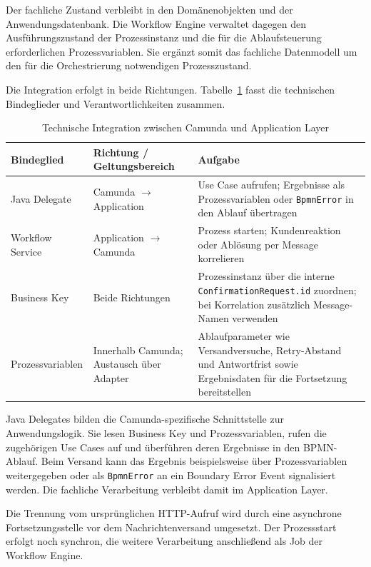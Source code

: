 \documentclass[
  12pt,
  a4paper,
  oneside
]{article}
\begin{document}
Der fachliche Zustand verbleibt in den Domänenobjekten und der
Anwendungsdatenbank. Die Workflow Engine verwaltet dagegen den
Ausführungszustand der Prozessinstanz und die für die Ablaufsteuerung
erforderlichen Prozessvariablen. Sie ergänzt somit das fachliche Datenmodell um
den für die Orchestrierung notwendigen Prozesszustand.

Die Integration erfolgt in beide Richtungen.
Tabelle~\ref{tab:workflow-integration} fasst die technischen Bindeglieder und
Verantwortlichkeiten zusammen.

\begin{table}[htbp]
  \centering
  \caption{Technische Integration zwischen Camunda und Application Layer}
  \label{tab:workflow-integration}
  \small
  \setlength{\tabcolsep}{5pt}
  \begin{tabularx}{\textwidth}{@{}>{\raggedright\arraybackslash}p{}>{\raggedright\arraybackslash}p{}>{\raggedright\arraybackslash}X@{}}
    \toprule
    Bindeglied & Richtung / Geltungsbereich & Aufgabe \\
    \midrule
    Java Delegate & Camunda $\rightarrow$ Application
      & Use Case aufrufen; Ergebnisse als Prozessvariablen oder \texttt{BpmnError} in den Ablauf übertragen \\
    Workflow Service & Application $\rightarrow$ Camunda
      & Prozess starten; Kundenreaktion oder Ablösung per Message korrelieren \\
    Business Key & Beide Richtungen
      & Prozessinstanz über die interne \texttt{ConfirmationRequest.id} zuordnen; bei Korrelation zusätzlich Message-Namen verwenden \\
    Prozessvariablen & Innerhalb Camunda; Austausch über Adapter
      & Ablaufparameter wie Versandversuche, Retry-Abstand und Antwortfrist sowie Ergebnisdaten für die Fortsetzung bereitstellen \\
    \bottomrule
  \end{tabularx}
\end{table}

Java Delegates bilden die Camunda-spezifische Schnittstelle zur
Anwendungslogik. Sie lesen Business Key und Prozessvariablen, rufen die
zugehörigen Use Cases auf und überführen deren Ergebnisse in den
BPMN-Ablauf. Beim Versand kann das Ergebnis beispielsweise über
Prozessvariablen weitergegeben oder als \texttt{BpmnError} an ein Boundary
Error Event signalisiert werden. Die fachliche Verarbeitung verbleibt damit im
Application Layer.

Die Trennung vom ursprünglichen HTTP-Aufruf wird durch eine asynchrone
Fortsetzungsstelle vor dem Nachrichtenversand umgesetzt. Der Prozessstart
erfolgt noch synchron, die weitere Verarbeitung anschließend als Job der
Workflow Engine.
\end{document}
